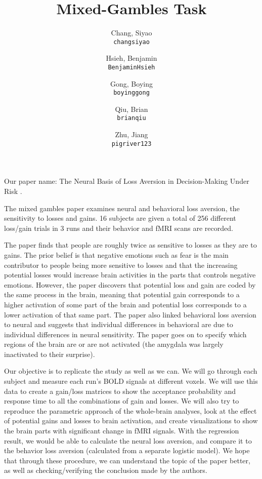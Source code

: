 \documentclass[11pt]{article}
\title{Mixed-Gambles Task}
\author{

  Chang, Siyao\\
  \texttt{changsiyao}
  \and
  Hsieh, Benjamin\\
  \texttt{BenjaminHsieh}
  \and
  Gong, Boying\\
  \texttt{boyinggong}
  \and
  Qiu, Brian\\
  \texttt{brianqiu}
  \and
  Zhu, Jiang\\
  \texttt{pigriver123}
}
\begin{document}
\maketitle
Our paper name: The Neural Basis of Loss Aversion in Decision-Making Under Risk \cite{Tom2007LossAversion}.

The mixed gambles paper examines neural and behavioral loss aversion, the
sensitivity to losses and gains. 16 subjects are given a total of 256
different loss/gain trials in 3 runs and their behavior and fMRI scans are
recorded. 

The paper finds that people are roughly twice as sensitive to losses as they
are to gains. The prior belief is that negative emotions such as fear is the
main contributor to people being more sensitive to losses and that the
increasing potential losses would increase brain activities in the parts that
controls negative emotions. However, the paper discovers that potential loss
and gain are coded by the same process in the brain, meaning that potential
gain corresponds to a higher activation of some part of the brain and
potential loss corresponds to a lower activation of that same part. The paper
also linked behavioral loss aversion to neural and suggests that individual
differences in behavioral are due to individual differences in neural
sensitivity. The paper goes on to specify which regions of the brain are or
are not activated (the amygdala was largely inactivated to their surprise).

Our objective is to replicate the study as well as we can. We will go through
each subject and measure each run's BOLD signals at different voxels. We will
use this data to create a gain/loss matrices to show the acceptance
probability and response time to all the combinations of gain and losses. We
will also try to reproduce the parametric approach of the whole-brain
analyses, look at the effect of potential gains and losses to brain
activation, and create visualizations to show the brain parts with significant
change in fMRI signals. With the regression result, we would be able to
calculate the neural loss aversion, and compare it to the behavior loss
aversion (calculated from a separate logistic model). We hope that through
these procedure, we can understand the topic of the paper better, as well as
checking/verifying the conclusion made by the authors. 


\end{document}
